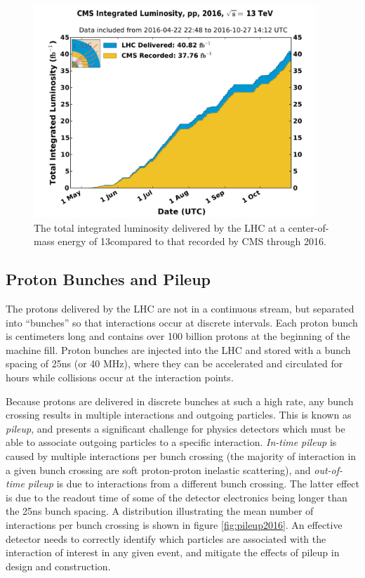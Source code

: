 \begin{figure}
	\centering
	\includegraphics[width=0.95\textwidth]{detector/figs/int_lumi_per_day_cumulative_pp_2016}
	\renewcommand{\baselinestretch}{1.0}
	\caption[The total integrated luminosity delivered by the LHC at a center-of-mass energy of 13\TeV compared to that recorded by CMS through 2016.]{The total integrated luminosity delivered by the LHC at a center-of-mass energy of 13\TeV compared to that recorded by CMS through 2016.}
	\label{fig:lumi}
\end{figure}

\subsection{Proton Bunches and Pileup}
\label{subsec:pileup}

The protons delivered by the LHC are not in a continuous stream, but separated into ``bunches'' so that interactions occur at discrete intervals. Each proton bunch is centimeters long and contains over 100 billion protons at the beginning of the machine fill. Proton bunches are injected into the LHC and stored with a bunch spacing of 25ns (or 40 MHz), where they can be accelerated and circulated for hours while collisions occur at the interaction points.

Because protons are delivered in discrete bunches at such a high rate, any bunch crossing results in multiple interactions and outgoing particles. This is known as {\it pileup}, and presents a significant challenge for physics detectors which must be able to associate outgoing particles to a specific interaction. {\it In-time pileup} is caused by multiple interactions per bunch crossing (the majority of interaction in a given bunch crossing are soft proton-proton inelastic scattering), and {\it out-of-time pileup} is due to interactions from a different bunch crossing. The latter effect is due to the  readout time of some of the detector electronics being longer than the 25ns bunch spacing. A distribution illustrating the mean number of interactions per bunch crossing is shown in figure \ref{fig:pileup2016}. An effective detector needs to correctly identify which particles are associated with the interaction of interest in any given event, and mitigate the effects of pileup in design and construction.


